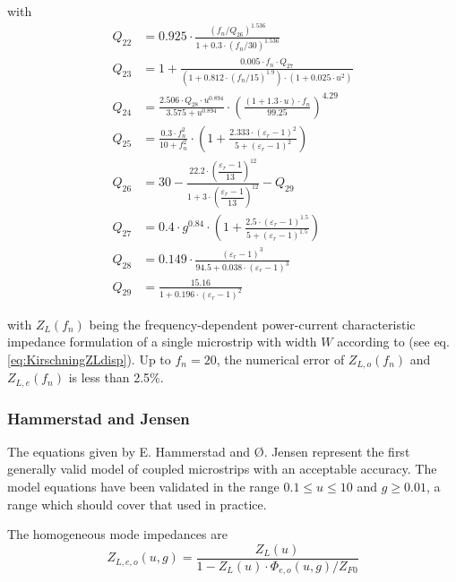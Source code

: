 \documentclass[10pt]{report}
\begin{document}
with
\begin{align}
Q_{22} &= 0.925\cdot \frac{ \left( f_n/Q_{26} \right) ^{1.536} }
                         { 1+0.3\cdot \left( f_n/30 \right)^{1.536} }\\
Q_{23} &= 1+ \frac{ 0.005\cdot f_n\cdot Q_{27} }
                 { \left( 1+0.812\cdot\left( f_n/15 \right) ^{1.9} \right) \cdot
		   \left(1 + 0.025\cdot u^2\right) }\\
Q_{24} &= \frac{2.506\cdot Q_{28}\cdot u^{0.894}}{3.575+u^{0.894}} \cdot
         \left( \frac{ (1+1.3\cdot u)\cdot f_n}{99.25} \right)^{4.29}\\
Q_{25} &= \frac{0.3\cdot f_n^2}{10+f_n^2}\cdot
         \left( 1+ \frac{2.333\cdot \left(\varepsilon_r-1\right)^2}{5+\left(\varepsilon_r-1\right)^2} \right)\\
Q_{26} &= 30 - \frac{ 22.2\cdot \left( \dfrac{\varepsilon_r-1}{13} \right)^{12} }
                   { 1+ 3\cdot \left( \dfrac{\varepsilon_r-1}{13} \right)^{12} } - Q_{29}\\
Q_{27} &= 0.4\cdot g^{0.84}\cdot \left( 1+
         \frac{2.5\cdot \left(\varepsilon_r-1\right)^{1.5}}{5+\left(\varepsilon_r-1\right)^{1.5}} \right)\\
Q_{28} &= 0.149\cdot \frac{\left(\varepsilon_r-1\right)^3}{94.5+0.038\cdot \left(\varepsilon_r-1\right)^3}\\
Q_{29} &= \frac{15.16}{1+0.196\cdot \left(\varepsilon_r-1\right)^2}
\end{align}

with $Z_L(f_n)$ being the frequency-dependent power-current
characteristic impedance formulation of a single microstrip with width
$W$ according to \cite{Kirschning1} (see
eq. \eqref{eq:KirschningZLdisp}).  Up to $f_n=20$, the numerical error
of $Z_{L,o}(f_n)$ and $Z_{L,e}(f_n)$ is less than 2.5\%.

\subsubsection{Hammerstad and Jensen}

The equations given by E. Hammerstad and {\O}. Jensen
\cite{Hammerstad} represent the first generally valid model of coupled
microstrips with an acceptable accuracy.  The model equations have
been validated in the range $0.1 \le u \le 10$ and $g \ge 0.01$, a
range which should cover that used in practice.

\addvspace{12pt}

The homogeneous mode impedances are
\begin{equation}
\label{eq:HandJZLeo}
Z_{L,e,o}\left(u, g\right) = \dfrac{Z_{L}(u)}{1 - Z_{L}(u)\cdot \Phi_{e,o}\left(u,g\right) / Z_{F0}}
\end{equation}
\end{document}
